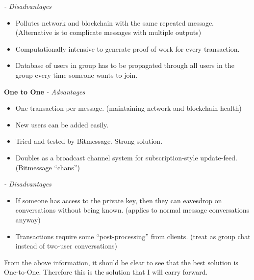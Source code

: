\documentclass{article}
\begin{document}
\textit{ - Disadvantages}
\begin{itemize}
    \item Pollutes network and blockchain with the same repeated message. (Alternative is to complicate messages with multiple outputs)
    \item Computationally intensive to generate proof of work for every transaction.
    \item Database of users in group has to be propagated through all users in the group every time someone wants to join.
\end{itemize}


\textbf{One to One}
\textit{ - Advantages}
\begin{itemize}
    \item One transaction per message. (maintaining network and blockchain health)
    \item New users can be added easily.
    \item Tried and tested by Bitmessage. Strong solution.
    \item Doubles as a broadcast channel system for subscription-style update-feed. (Bitmessage ``chans'')
\end{itemize}

\textit{ - Disadvantages}
\begin{itemize}
    \item If someone has access to the private key, then they can eavesdrop on conversations without being known. (applies to normal message conversations anyway)
    \item Transactions require some ``post-processing'' from clients. (treat as group chat instead of two-user conversations)
\end{itemize}

From the above information, it should be clear to see that the best solution is One-to-One. Therefore this is the solution that I will carry forward.
\newpage
\end{document}
